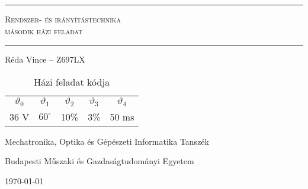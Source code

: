 \begin{titlepage}
\begin{center}

\vspace*{1cm}

{\hrule height 1pt}
\vspace{3mm}
\Huge
\textsc{Rendszer- és irányítástechnika}\\
\Large
\textsc{második házi feladat}
\vspace{6mm}
{\hrule height 1pt}
\vspace{14mm}

\Large
Réda Vince -- Z697LX
\normalsize
\vspace{2cm}

\vfill
\begin{table}[H]
\begin{tabular}{ccccc}
\toprule
$\vartheta_0$& $\vartheta_1$& $\vartheta_2$& $\vartheta_3$& $\vartheta_4$\\
36 V& $60^\circ$& 10\%& 3\%& 50 ms\\
\bottomrule
\end{tabular}
\caption{Házi feladat kódja}
\end{table}
\vspace{1cm}

\large
Mechatronika, Optika és Gépészeti Informatika Tanszék

Budapesti Műszaki és Gazdaságtudományi Egyetem

\vspace{5mm}
\today

\end{center}
\end{titlepage}
